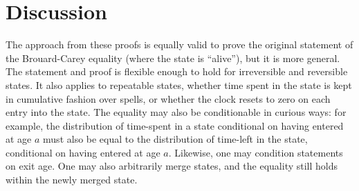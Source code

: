\documentclass[12pt,oneside,a4paper]{article}
\theoremstyle{definition}
\begin{document}




\section{Discussion}
The approach from these proofs is equally valid to prove the
original statement of the Brouard-Carey equality (where the state is ``alive''),
but it is more general.
The statement and proof is flexible enough to hold for irreversible and reversible
states. It also applies to repeatable states, whether time spent in the
state is kept in cumulative fashion over spells, or whether the clock resets to
zero on each entry into the state. The equality may also be conditionable in
curious ways: for example, the distribution of time-spent in a state conditional
on having entered at age $a$ must also be equal to the distribution of time-left in
the state, conditional on having entered at age $a$. Likewise, one may condition
statements on exit age. One may also arbitrarily merge states, and the equality
still holds within the newly merged state.
\end{document}
